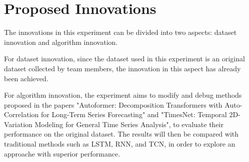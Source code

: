 \section{Proposed Innovations}
\label{sec:innovation}
The innovations in this experiment can be divided into two aspects: dataset innovation and algorithm innovation.

For dataset innovation, since the dataset used in this experiment is an original dataset collected by team members, the innovation in this aspect has already been achieved.

For algorithm innovation, the experiment aims to modify and debug methods proposed in the papers "Autoformer\cite{NEURIPS2021_bcc0d400}: Decomposition Transformers with Auto-Correlation for Long-Term Series Forecasting" and "TimesNet\cite{DBLP:journals/corr/abs-2210-02186}: Temporal 2D-Variation Modeling for General Time Series Analysis", to evaluate their performance on the original dataset. The results will then be compared with traditional methods such as LSTM, RNN, and TCN, in order to explore an approache with superior performance.
